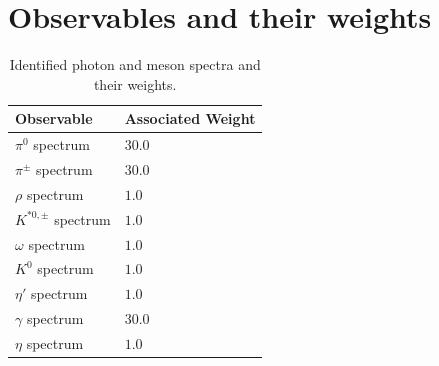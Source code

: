 \documentclass[aps,preprint,floatfix,nofootinbib,showpacs]{revtex4-1}
\begin{document}
\section{Observables and their weights}
 \begin{table}[!h]
  \begin{center}
   \begin{tabular}{l|l}
    \hline 
    \hline
    Observable  \hspace{3cm} &  \hspace{1cm} Associated Weight \\ \hline
    $\pi^0$ spectrum & \hspace{3cm} $30.0$ \\ \hline
    $\pi^\pm$ spectrum & \hspace{3cm} $30.0$ \\ \hline
    $\rho$ spectrum &\hspace{3cm} $1.0$ \\ \hline
    $K^{*0,\pm}$ spectrum &\hspace{3cm} $1.0$ \\ \hline
    $\omega$ spectrum & \hspace{3cm} $1.0$ \\ \hline
    $K^0$ spectrum & \hspace{3cm} $1.0$ \\ \hline
    $\eta'$ spectrum & \hspace{3cm} $1.0$ \\ \hline
    $\gamma$ spectrum & \hspace{3cm} $30.0$ \\ \hline
    $\eta$ spectrum & \hspace{3cm} $1.0$ \\ \hline \hline
   \end{tabular}
  \end{center}
  \caption{Identified photon and meson spectra and their weights.}
  \label{Tab1}
 \end{table}
 
\end{document}
